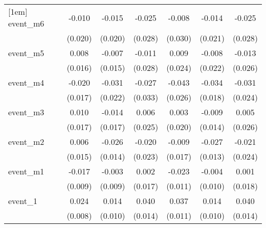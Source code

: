 {\begin{tabular}{l*{6}{c}}
[1em]
event\_m6    &      -0.010         &      -0.015         &      -0.025         &      -0.008         &      -0.014         &      -0.025         \\
            &     (0.020)         &     (0.020)         &     (0.028)         &     (0.030)         &     (0.021)         &     (0.028)         \\
[1em]
event\_m5    &       0.008         &      -0.007         &      -0.011         &       0.009         &      -0.008         &      -0.013         \\
            &     (0.016)         &     (0.015)         &     (0.028)         &     (0.024)         &     (0.022)         &     (0.026)         \\
[1em]
event\_m4    &      -0.020         &      -0.031         &      -0.027         &      -0.043         &      -0.034         &      -0.031         \\
            &     (0.017)         &     (0.022)         &     (0.033)         &     (0.026)         &     (0.018)         &     (0.024)         \\
[1em]
event\_m3    &       0.010         &      -0.014         &       0.006         &       0.003         &      -0.009         &       0.005         \\
            &     (0.017)         &     (0.017)         &     (0.025)         &     (0.020)         &     (0.014)         &     (0.026)         \\
[1em]
event\_m2    &       0.006         &      -0.026         &      -0.020         &      -0.009         &      -0.027\sym{*}  &      -0.021         \\
            &     (0.015)         &     (0.014)         &     (0.023)         &     (0.017)         &     (0.013)         &     (0.024)         \\
[1em]
event\_m1    &      -0.017         &      -0.003         &       0.002         &      -0.023\sym{*}  &      -0.004         &       0.001         \\
            &     (0.009)         &     (0.009)         &     (0.017)         &     (0.011)         &     (0.010)         &     (0.018)         \\
[1em]
event\_1     &       0.024\sym{**} &       0.014         &       0.040\sym{**} &       0.037\sym{***}&       0.014         &       0.040\sym{**} \\
            &     (0.008)         &     (0.010)         &     (0.014)         &     (0.011)         &     (0.010)         &     (0.014)         \\

\end{tabular}}
